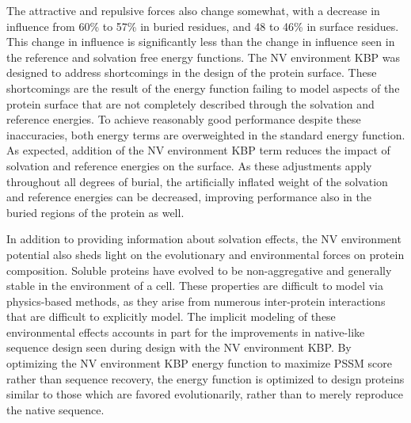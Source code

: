 The attractive and repulsive forces also change somewhat, with a decrease in influence from 60\% to 57\% in buried residues, and 48 to 46\% in surface residues.
This change in influence is significantly less than the change in influence seen in the reference and solvation free energy functions.
The NV environment KBP was designed to address shortcomings in the design of the protein surface.
These shortcomings are the result of the energy function failing to model aspects of the protein surface that are not completely described through the solvation and reference energies.
To achieve reasonably good performance despite these inaccuracies, both energy terms are overweighted in the standard energy function.
As expected, addition of the NV environment KBP term reduces the impact of solvation and reference energies on the surface.
As these adjustments apply throughout all degrees of burial, the artificially inflated weight of the solvation and reference energies can be decreased, improving performance also in the buried regions of the protein as well.

In addition to providing information about solvation effects, the NV environment potential also sheds light on the evolutionary and environmental forces on protein composition.
Soluble proteins have evolved to be non-aggregative and generally stable in the environment of a cell.
These properties are difficult to model via physics-based methods, as they arise from numerous inter-protein interactions that are difficult to explicitly model.
The implicit modeling of these environmental effects accounts in part for the improvements in native-like sequence design seen during design with the NV environment KBP.
By optimizing the NV environment KBP energy function to maximize PSSM score rather than sequence recovery, the energy function is optimized to design proteins similar to those which are favored evolutionarily, rather than to merely reproduce the native sequence.